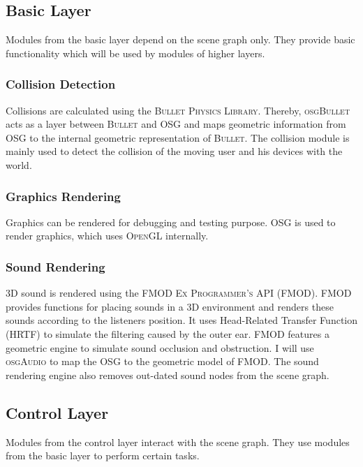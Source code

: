 \documentclass{article}
\begin{document}
\subsection{Basic Layer}

Modules from the basic layer depend on the scene graph only. They provide basic
functionality which will be used by modules of higher layers.

\subsubsection{Collision Detection}

Collisions are calculated using the \textsc{Bullet Physics
Library}\cite{bullet}. Thereby, \textsc{osgBullet}\cite{osgBullet} acts as a
layer between \textsc{Bullet} and OSG and maps geometric
information from OSG to the internal geometric representation of
\textsc{Bullet}. The collision module is mainly used to detect the collision of
the moving user and his devices with the world.

\subsubsection{Graphics Rendering}

Graphics can be rendered for debugging and testing purpose. OSG is used to
render graphics, which uses \textsc{OpenGL}\cite{opengl} internally.

\subsubsection{Sound Rendering}

3D sound is rendered using the \textsc{FMOD Ex Programmer's API}
(FMOD)\cite{fmod}.
FMOD provides functions for placing sounds in a 3D environment and renders these
sounds according to the listeners position. It uses Head-Related Transfer
Function (HRTF) to simulate the filtering caused by the outer ear. FMOD features
a geometric engine to simulate sound occlusion and obstruction. I will use
\textsc{osgAudio}\cite{osgAudio} to map the OSG to the geometric model of FMOD.
The sound rendering engine also removes out-dated sound nodes from the scene
graph.

\subsection{Control Layer}

Modules from the control layer interact with the scene graph. They use modules
from the basic layer to perform certain tasks.
\end{document}
